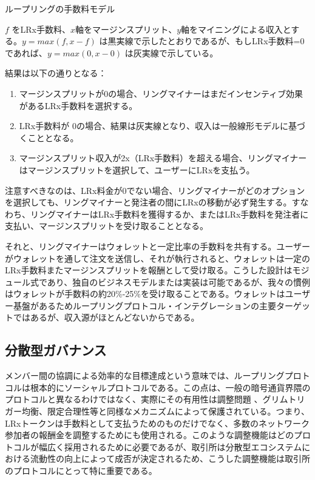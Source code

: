 \documentclass{article}
\makeatletter
\newenvironment{figurehere}
 {\def\@captype{figure}}
 {}
\makeatother
\begin{document}
\begin{multicols}{2}
\begin{center}
\begin{figurehere}
\begin{tikzpicture}[
font=\normalfont,
oneway/.style={->,dashed,shorten >=2pt,shorten <=2pt,>=stealth},
scale=1]
\end{tikzpicture}
\caption{ループリングの手数料モデル}
\label{fig:feemodel}
\end{figurehere}
\end{center}

 $f$ をLRx手数料、$x$軸をマージンスプリット、$y$軸をマイニングによる収入とする。$y=max(f, x-f)$ は黒実線で示したとおりであるが、もしLRx手数料=0であれば、$y=max(0, x - 0)$ は灰実線で示している。


結果は以下の通りとなる：
\begin{enumerate}
	\item マージンスプリットが0の場合、リングマイナーはまだインセンティブ効果があるLRx手数料を選択する。
	\item LRx手数料が 0の場合、結果は灰実線となり、収入は一般線形モデルに基づくこととなる。
	\item マージンスプリット収入が2x（LRx手数料）を超える場合、リングマイナーはマージンスプリットを選択して、ユーザーにLRxを支払う。
\end{enumerate}

注意すべきなのは、LRx料金が0でない場合、リングマイナーがどのオプションを選択しても、リングマイナーと発注者の間にLRxの移動が必ず発生する。すなわち、リングマイナーはLRx手数料を獲得するか、またはLRx手数料を発注者に支払い、マージンスプリットを受け取ることとなる。

それと、リングマイナーはウォレットと一定比率の手数料を共有する。ユーザーがウォレットを通して注文を送信し、それが執行されると、ウォレットは一定のLRx手数料またマージンスプリットを報酬として受け取る。こうした設計はモジュール式であり、独自のビジネスモデルまたは実装は可能であるが、我々の慣例はウォレットが手数料の約20\%-25\%を受け取ることである。ウォレットはユーザー基盤があるためループリングプロトコル・インテグレーションの主要ターゲットではあるが、収入源がほとんどないからである。


\subsection{分散型ガバナンス}

メンバー間の協調による効率的な目標達成という意味では、ループリングプロトコルは根本的にソーシャルプロトコルである。この点は、一般の暗号通貨界隈のプロトコルと異なるわけではなく、実際にその有用性は調整問題 \cite{vitalikgovernance}、グリムトリガー均衡、限定合理性等と同様なメカニズムによって保護されている。つまり、LRxトークンは手数料として支払うためのものだけでなく、多数のネットワーク参加者の報酬金を調整するためにも使用される。このような調整機能はどのプロトコルが幅広く採用されるために必要であるが、取引所は分散型エコシステムにおける流動性の向上によって成否が決定されるため、こうした調整機能は取引所のプロトコルにとって特に重要である。


\end{multicols}
\end{document}
